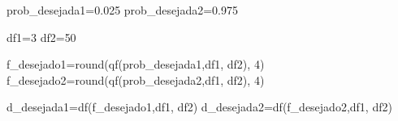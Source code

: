 \documentclass[
]{book}
\newenvironment{Shaded}{\begin{snugshade}}{\end{snugshade}}
\newcommand{\DecValTok}[1]{\textcolor[rgb]{0.00,0.00,0.81}{#1}}
\newcommand{\FloatTok}[1]{\textcolor[rgb]{0.00,0.00,0.81}{#1}}
\newcommand{\FunctionTok}[1]{\textcolor[rgb]{0.00,0.00,0.00}{#1}}
\newcommand{\NormalTok}[1]{#1}
\newcommand{\OtherTok}[1]{\textcolor[rgb]{0.56,0.35,0.01}{#1}}
\begin{document}
\begin{Shaded}
\begin{Highlighting}[]
\NormalTok{prob\_desejada1}\OtherTok{=}\FloatTok{0.025}
\NormalTok{prob\_desejada2}\OtherTok{=}\FloatTok{0.975}

\NormalTok{df1}\OtherTok{=}\DecValTok{3}
\NormalTok{df2}\OtherTok{=}\DecValTok{50}  

\NormalTok{f\_desejado1}\OtherTok{=}\FunctionTok{round}\NormalTok{(}\FunctionTok{qf}\NormalTok{(prob\_desejada1,df1, df2), }\DecValTok{4}\NormalTok{)}
\NormalTok{f\_desejado2}\OtherTok{=}\FunctionTok{round}\NormalTok{(}\FunctionTok{qf}\NormalTok{(prob\_desejada2,df1, df2), }\DecValTok{4}\NormalTok{)}

\NormalTok{d\_desejada1}\OtherTok{=}\FunctionTok{df}\NormalTok{(f\_desejado1,df1, df2)}
\NormalTok{d\_desejada2}\OtherTok{=}\FunctionTok{df}\NormalTok{(f\_desejado2,df1, df2)}



\end{Highlighting}
\end{Shaded}
\end{document}
